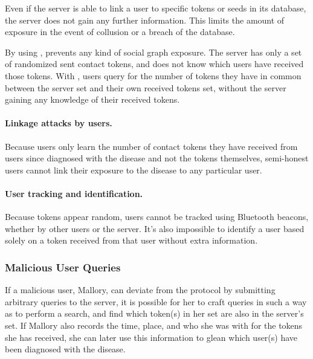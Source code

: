 {	Even if the \dect server is able to link a user to specific tokens or seeds in its database, the server does not gain any further information. This limits the amount of exposure in the event of collusion or a breach of the database.
	
	By using \psica, \dect prevents any kind of social graph exposure. The \dect server has only a set of randomized sent contact tokens, and does not know which users have received those tokens. With \psica, users query for the number of tokens they have in common between the \dect server set and their own received tokens set, without the server gaining any knowledge of their received tokens.
	
	\paragraph{Linkage attacks by users.} Because users only learn the number of contact tokens they have received from users since diagnosed with the disease and not the tokens themselves, semi-honest users cannot link their exposure to the disease to any particular user.
	
	\paragraph{User tracking and identification.} Because tokens appear random, users cannot be tracked using Bluetooth beacons, whether by other users or the \dect server. It's also impossible to identify a user based solely on a token received from that user without extra information.
	
	\subsubsection{Malicious User Queries}
	
	If a malicious user, Mallory, can deviate from the protocol by submitting arbitrary queries to the \dect server, it is possible for her to craft queries in such a way as to perform a search, and find which token(s) in her set are also in the server's set. If Mallory also records the time, place, and who she was with for the tokens she has received, she can later use this information to glean which user(s) have been diagnosed with the disease.
	
}
